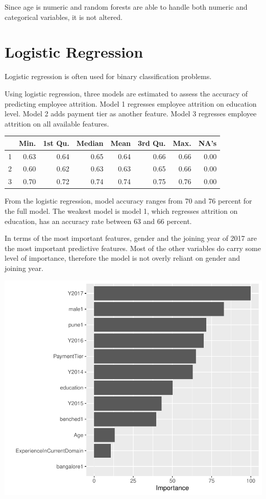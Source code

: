 \documentclass[11pt,preprint, authoryear]{elsarticle}
\let\origtable\table
\let\endorigtable\endtable
\renewenvironment{table}[1][2] {
    \expandafter\origtable\expandafter[H]
} {
    \endorigtable
}
\numberwithin{equation}{section}
\numberwithin{figure}{section}
\numberwithin{table}{section}
\begin{document}
Since age is numeric and random forests are able to handle both numeric
and categorical variables, it is not altered.

\hypertarget{logistic-regression}{%
\section*{Logistic Regression}\label{logistic-regression}}

Logistic regression is often used for binary classification problems.

Using logistic regression, three models are estimated to assess the
accuracy of predicting employee attrition. Model 1 regresses employee
attrition on education level. Model 2 adds payment tier as another
feature. Model 3 regresses employee attrition on all available features.

\begin{table}[H]
\centering
\begin{tabular}{rrrrrrrr}
  \hline
 & Min. & 1st Qu. & Median & Mean & 3rd Qu. & Max. & NA's \\ 
  \hline
1 & 0.63 & 0.64 & 0.65 & 0.64 & 0.66 & 0.66 & 0.00 \\ 
  2 & 0.60 & 0.62 & 0.63 & 0.63 & 0.65 & 0.66 & 0.00 \\ 
  3 & 0.70 & 0.72 & 0.74 & 0.74 & 0.75 & 0.76 & 0.00 \\ 
   \hline
\end{tabular}
\caption{Accuracy across logistic models \label{tab1}} 
\end{table}

From the logistic regression, model accuracy ranges from 70 and 76
percent for the full model. The weakest model is model 1, which
regresses attrition on education, has an accuracy rate between 63 and 66
percent.

In terms of the most important features, gender and the joining year of
2017 are the most important predictive features. Most of the other
variables do carry some level of importance, therefore the model is not
overly reliant on gender and joining year.

\includegraphics{Final_project_files/figure-latex/unnamed-chunk-11-1.pdf}
\end{document}
